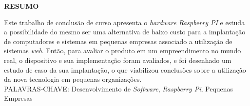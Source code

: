 \begin{center}
\textbf{RESUMO}
\end{center}
\singlespacing

\noindent Este trabalho de conclusão de curso apresenta o \textit{hardware Raspberry PI} e estuda a possibilidade do mesmo ser uma alternativa de baixo custo para a implantação de computadores e sistemas em pequenas empresas associado a utilização de sistemas \textit{web}. Então, para avaliar o produto em um empreendimento no mundo real, o dispositivo e sua implementação foram avaliados, e foi desenhado um estudo de caso da sua implantação, o que viabilizou conclusões sobre a utilização da nova tecnologia em pequenas organizações.\\

\noindent PALAVRAS-CHAVE: Desenvolvimento de \textit{Software}, \textit{Raspberry Pi}, Pequenas Empresas
